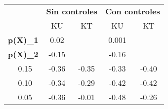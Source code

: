 \begin{tabular}{@{}llcc|cc@{}}
\toprule
& & \multicolumn{2}{c}{\textbf{Sin controles}} & \multicolumn{2}{c}{\textbf{Con controles}} \\
& & KU & KT & KU & KT \\
\midrule
\multicolumn{2}{l}{\textbf{p(X)_1}} & 0.02 & & 0.001 & \\
\multicolumn{2}{l}{\textbf{p(X)_2}} & -0.15 & & -0.16 & \\
\midrule
\multirow{3}{*}{} 
& 0.15 & -0.36 & -0.35 & -0.33 & -0.40 \\
& 0.10 & -0.34 & -0.29 & -0.42 & -0.42 \\
& 0.05 & -0.36 & -0.01 & -0.48 & -0.26 \\
\bottomrule
\end{tabular}
